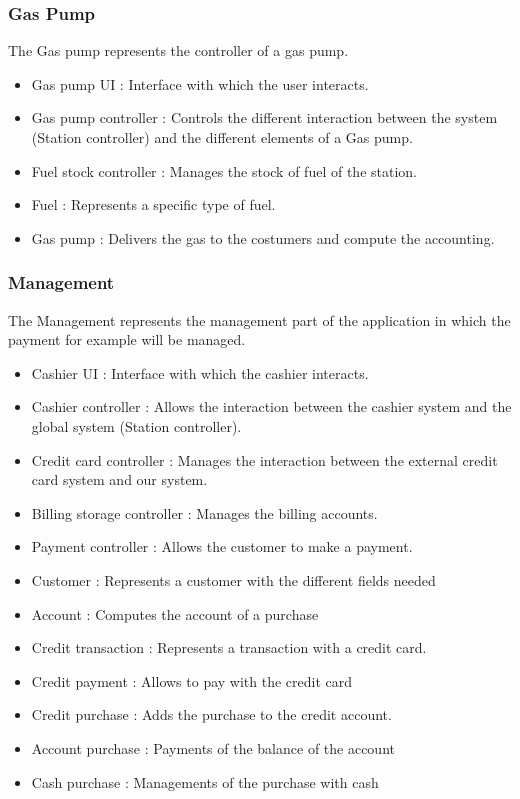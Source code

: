 \documentclass[11pt,a4paper]{article}
\begin{document}
\subsubsection*{Gas Pump}
The Gas pump represents the controller of a gas pump.
\begin{itemize}
\item{Gas pump UI :} Interface with which the user interacts.
\item{Gas pump controller :} Controls the different interaction between the system (Station controller) and the different elements of a Gas pump.
\item{Fuel stock controller :} Manages the stock of fuel of the station.
\item{Fuel :} Represents a specific type of fuel.
\item{Gas pump :} Delivers the gas to the costumers and compute the accounting. 
\end{itemize}
\subsubsection*{Management}
The Management represents the management part of the application in which the payment for example will be managed.
\begin{itemize}
\item{Cashier UI :} Interface with which the cashier interacts.
\item{Cashier controller :} Allows the interaction between the cashier system and the global system (Station controller).
\item{Credit card controller :} Manages the interaction between the external credit card system and our system.
\item{Billing storage controller :} Manages the billing accounts.
\item{Payment controller :} Allows the customer to make a payment.
\item{Customer :} Represents a customer with the different fields needed
\item{Account :} Computes the account of a purchase
\item{Credit transaction :} Represents a transaction with a credit card. 
\item{Credit payment :} Allows to pay with the credit card
\item{Credit purchase :} Adds the purchase to the credit account.
\item{Account purchase :} Payments of the balance of the account 
\item{Cash purchase :} Managements of the purchase with cash
\end{itemize}


\end{document}
